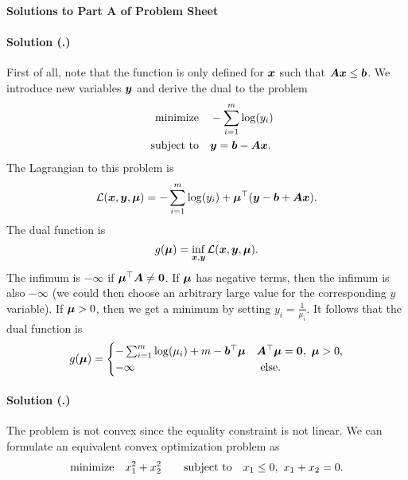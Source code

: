 \documentclass{article}
\newcounter{problemSheetNumber}
\newcounter{problems}
\renewcommand{\solution}[1]{\paragraph{Solution (\theproblemSheetNumber.\theproblems)}\addtocounter{problems}{1}\label{#1}}
\begin{document}
 
\begin{center}
{\Large {\bf Solutions to Part A of Problem Sheet \theproblemSheetNumber}}
\end{center}

\solution{pr:1} First of all, note that the function is only defined for $\bm{x}$ such that $\bm{A}\bm{x}\leq \bm{b}$. We introduce new variables $\bm{y}$ and derive the dual to the problem
\begin{align*}
 \text{minimize}\quad & -\sum_{i=1}^m \log(y_i)\\
 \quad\text{subject to}\quad & \bm{y}=\bm{b}-\bm{A}\bm{x}.
\end{align*}
The Lagrangian to this problem is
\begin{equation*}
 \mathcal{L}(\bm{x},\bm{y},\bm{\mu}) = -\sum_{i=1}^m \log(y_i)+\bm{\mu}^{\top}(\bm{y}-\bm{b}+\bm{A}\bm{x}).
\end{equation*}
The dual function is
\begin{equation*}
 g(\bm{\mu}) = \inf_{\bm{x},\bm{y}} \mathcal{L}(\bm{x},\bm{y},\bm{\mu}).
\end{equation*}
The infimum is $-\infty$ if $\bm{\mu}^{\top}\bm{A}\neq \bm{0}$. If $\bm{\mu}$ has negative terms, then the infimum is also $-\infty$ (we could then choose an arbitrary large value for the corresponding $y$ variable). If $\bm{\mu}>0$, then we get a minimum by setting $y_i=\frac{1}{\mu_i}$. It follows that the dual function is
\begin{equation*}
 g(\bm{\mu}) = \begin{cases}
                   -\sum_{i=1}^m \log(\mu_i)+m-\bm{b}^{\top}\bm{\mu} & \bm{A}^{\top}\bm{\mu}=\bm{0}, \ \bm{\mu}>0,\\
                   -\infty & \text{ else.}
                \end{cases}
\end{equation*}

\solution{pr:2} The problem is not convex since the equality constraint is not linear. We can formulate an equivalent convex optimization problem as
\begin{equation*}
  \text{minimize}\quad x_1^2+x_2^2 \quad \quad\text{subject to}\quad x_1\leq 0, \ x_1+x_2=0.
\end{equation*}
\end{document}
